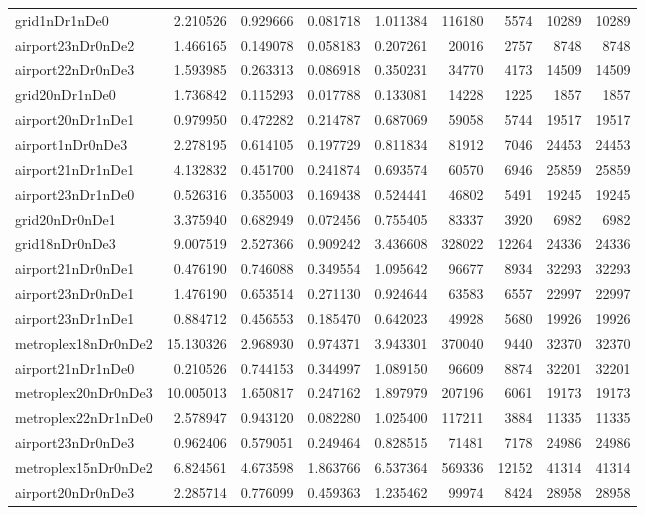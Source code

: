 \begin{longtable}{|l|r|r|r|r|r|r|r|r|}
grid1nDr1nDe0 & 2.210526 & 0.929666 & 0.081718 & 1.011384 & 116180 & 5574 & 10289 & 10289 \\
airport23nDr0nDe2 & 1.466165 & 0.149078 & 0.058183 & 0.207261 & 20016 & 2757 & 8748 & 8748 \\
airport22nDr0nDe3 & 1.593985 & 0.263313 & 0.086918 & 0.350231 & 34770 & 4173 & 14509 & 14509 \\
grid20nDr1nDe0 & 1.736842 & 0.115293 & 0.017788 & 0.133081 & 14228 & 1225 & 1857 & 1857 \\
airport20nDr1nDe1 & 0.979950 & 0.472282 & 0.214787 & 0.687069 & 59058 & 5744 & 19517 & 19517 \\
airport1nDr0nDe3 & 2.278195 & 0.614105 & 0.197729 & 0.811834 & 81912 & 7046 & 24453 & 24453 \\
airport21nDr1nDe1 & 4.132832 & 0.451700 & 0.241874 & 0.693574 & 60570 & 6946 & 25859 & 25859 \\
airport23nDr1nDe0 & 0.526316 & 0.355003 & 0.169438 & 0.524441 & 46802 & 5491 & 19245 & 19245 \\
grid20nDr0nDe1 & 3.375940 & 0.682949 & 0.072456 & 0.755405 & 83337 & 3920 & 6982 & 6982 \\
grid18nDr0nDe3 & 9.007519 & 2.527366 & 0.909242 & 3.436608 & 328022 & 12264 & 24336 & 24336 \\
airport21nDr0nDe1 & 0.476190 & 0.746088 & 0.349554 & 1.095642 & 96677 & 8934 & 32293 & 32293 \\
airport23nDr0nDe1 & 1.476190 & 0.653514 & 0.271130 & 0.924644 & 63583 & 6557 & 22997 & 22997 \\
airport23nDr1nDe1 & 0.884712 & 0.456553 & 0.185470 & 0.642023 & 49928 & 5680 & 19926 & 19926 \\
metroplex18nDr0nDe2 & 15.130326 & 2.968930 & 0.974371 & 3.943301 & 370040 & 9440 & 32370 & 32370 \\
airport21nDr1nDe0 & 0.210526 & 0.744153 & 0.344997 & 1.089150 & 96609 & 8874 & 32201 & 32201 \\
metroplex20nDr0nDe3 & 10.005013 & 1.650817 & 0.247162 & 1.897979 & 207196 & 6061 & 19173 & 19173 \\
metroplex22nDr1nDe0 & 2.578947 & 0.943120 & 0.082280 & 1.025400 & 117211 & 3884 & 11335 & 11335 \\
airport23nDr0nDe3 & 0.962406 & 0.579051 & 0.249464 & 0.828515 & 71481 & 7178 & 24986 & 24986 \\
metroplex15nDr0nDe2 & 6.824561 & 4.673598 & 1.863766 & 6.537364 & 569336 & 12152 & 41314 & 41314 \\
airport20nDr0nDe3 & 2.285714 & 0.776099 & 0.459363 & 1.235462 & 99974 & 8424 & 28958 & 28958 \\

\end{longtable}
